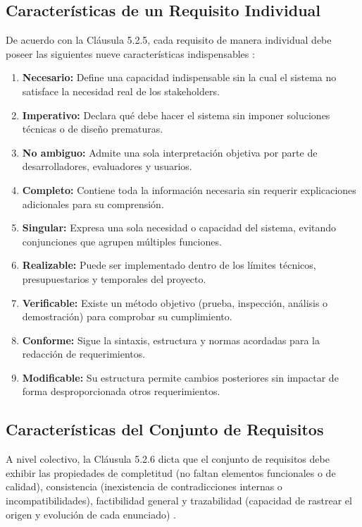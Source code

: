 \documentclass[11pt, a4paper]{article}
\begin{document}
\subsection{Características de un Requisito Individual}
De acuerdo con la Cláusula 5.2.5, cada requisito de manera individual debe poseer las siguientes nueve características indispensables \cite{iso29148}:
\begin{enumerate}
    \item \textbf{Necesario:} Define una capacidad indispensable sin la cual el sistema no satisface la necesidad real de los stakeholders.
    \item \textbf{Imperativo:} Declara qué debe hacer el sistema sin imponer soluciones técnicas o de diseño prematuras.
    \item \textbf{No ambiguo:} Admite una sola interpretación objetiva por parte de desarrolladores, evaluadores y usuarios.
    \item \textbf{Completo:} Contiene toda la información necesaria sin requerir explicaciones adicionales para su comprensión.
    \item \textbf{Singular:} Expresa una sola necesidad o capacidad del sistema, evitando conjunciones que agrupen múltiples funciones.
    \item \textbf{Realizable:} Puede ser implementado dentro de los límites técnicos, presupuestarios y temporales del proyecto.
    \item \textbf{Verificable:} Existe un método objetivo (prueba, inspección, análisis o demostración) para comprobar su cumplimiento.
    \item \textbf{Conforme:} Sigue la sintaxis, estructura y normas acordadas para la redacción de requerimientos.
    \item \textbf{Modificable:} Su estructura permite cambios posteriores sin impactar de forma desproporcionada otros requerimientos.
\end{enumerate}

\subsection{Características del Conjunto de Requisitos}
A nivel colectivo, la Cláusula 5.2.6 dicta que el conjunto de requisitos debe exhibir las propiedades de completitud (no faltan elementos funcionales o de calidad), consistencia (inexistencia de contradicciones internas o incompatibilidades), factibilidad general y trazabilidad (capacidad de rastrear el origen y evolución de cada enunciado) \cite{iso29148}.
\end{document}
